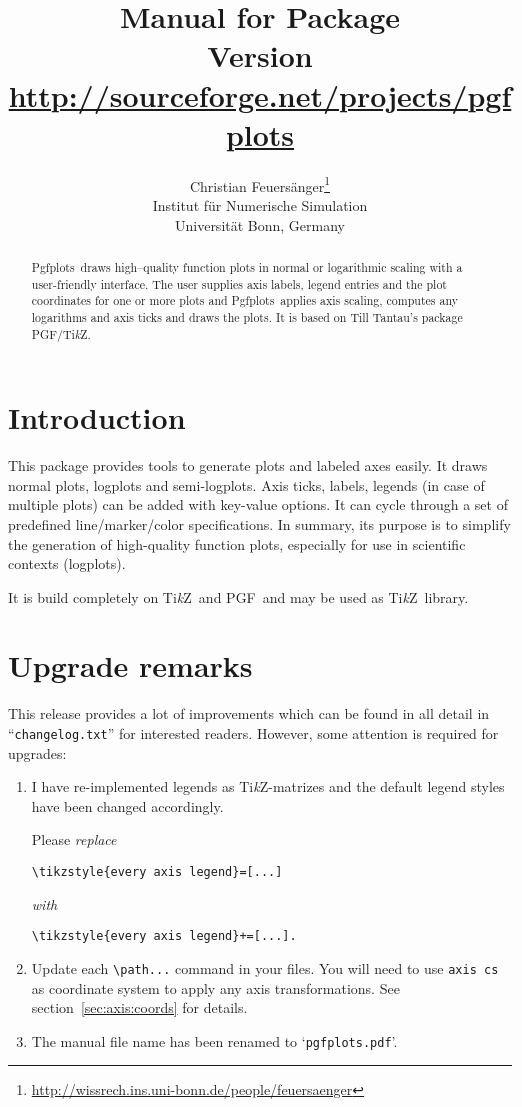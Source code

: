 \documentclass[a4paper]{article}
\author{%
	Christian Feuers\"anger\footnote{\url{http://wissrech.ins.uni-bonn.de/people/feuersaenger}}\\%
	Institut f\"ur Numerische Simulation\\
	Universit\"at Bonn, Germany}
\title{%
	Manual for Package \PGFPlots\\
	{\small Version \pgfplotsversion}\\
	{\small\href{http://sourceforge.net/projects/pgfplots}{http://sourceforge.net/projects/pgfplots}}}
\newcommand\Tikz{Ti\textit kZ}
\newcommand\PGF{PGF}
\newcommand\PGFPlots{Pgfplots}
\begin{document}
\maketitle
\begin{abstract}%
\PGFPlots\ draws high--quality function plots in normal or logarithmic scaling with a user-friendly interface. The user supplies axis labels, legend entries and the plot coordinates for one or more plots and \PGFPlots\ applies axis scaling, computes any logarithms and axis ticks and draws the plots. It is based on Till Tantau's package \PGF/\Tikz.
\end{abstract}
\tableofcontents
\section{Introduction}
This package provides tools to generate plots and labeled axes easily. It draws normal plots, logplots and semi-logplots. Axis ticks, labels, legends (in case of multiple plots) can be added with key-value options. It can cycle through a set of predefined line/marker/color specifications. In summary, its purpose is to simplify the generation of high-quality function plots, especially for use in scientific contexts (logplots).

It is build completely on \Tikz\ and \PGF\ and may be used as \Tikz\ library. 

\section{Upgrade remarks}
This release provides a lot of improvements which can be found in all detail in ``\texttt{changelog.txt}'' for interested readers. However, some attention is required for upgrades:
\begin{enumerate}
	\item I have re-implemented legends as \Tikz-matrizes and the default legend styles have been changed accordingly.

	Please \emph{replace} 
	\begin{lstlisting}
\tikzstyle{every axis legend}=[...]
	\end{lstlisting}
	\emph{with} 
\begin{lstlisting}
\tikzstyle{every axis legend}+=[...].
\end{lstlisting}

	\item Update each \lstinline!\path...! command in your files. You will need to use \lstinline!axis cs! as coordinate system to apply any axis transformations. See section~\ref{sec:axis:coords} for details.

	\item The manual file name has been renamed to `\texttt{pgfplots.pdf}'.
\end{enumerate}

%
%
%
%
%


\end{document}
